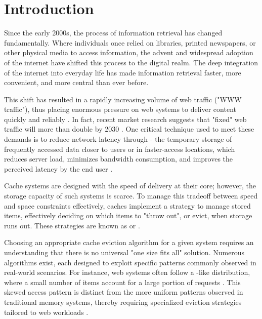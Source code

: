 \chapter{Introduction}\label{chapter:introduction}


Since the early 2000s, the process of information retrieval has changed fundamentally. Where individuals once relied on libraries, printed newspapers, or other physical media to access information, the advent and widespread adoption of the internet have shifted this process to the digital realm. The deep integration of the internet into everyday life has made information retrieval faster, more convenient, and more central than ever before.

This shift has resulted in a rapidly increasing volume of web traffic ("WWW traffic"), thus placing enormous pressure on web systems to deliver content quickly and reliably \cite{web-cache-overview}. In fact, recent market research suggests that "fixed" web traffic will more than double by 2030 \cite{digital-global-report}. One critical technique used to meet these demands is to reduce network latency through  - the temporary storage of frequently accessed data closer to users or in faster-access locations, which reduces server load, minimizes bandwidth consumption, and improves the perceived latency by the end user \cite{latency-caching, web-cache-overview}.


Cache systems are designed with the speed of delivery at their core; however, the storage capacity of such systems is scarce. To manage this tradeoff between speed and space constraints effectively, caches implement a strategy to manage stored items, effectively deciding on which items to "throw out", or evict, when storage runs out. These strategies are known as  or  \cite{web-cache-overview}.



Choosing an appropriate cache eviction algorithm for a given system requires an understanding that there is no universal "one size fits all" solution. Numerous algorithms exist, each designed to exploit specific patterns commonly observed in real-world scenarios. For instance, web systems often follow a -like distribution, where a small number of items account for a large portion of requests \cite{sieve, web-cache-overview}. This skewed access pattern is distinct from the more uniform patterns observed in traditional memory systems, thereby requiring specialized eviction strategies tailored to web workloads \cite{web-cache-overview}.


